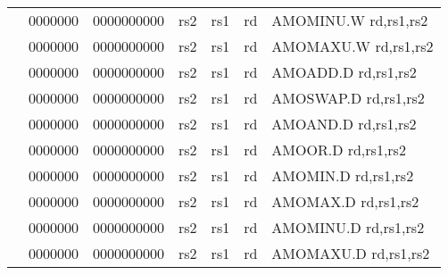 \begin{table}[p]
\begin{small}
\begin{center}
\begin{tabular}{rcccccccccl}
&
\multicolumn{1}{|c|}{0000000} &
\multicolumn{5}{c|}{0000000000} &
\multicolumn{1}{c|}{rs2} &
\multicolumn{1}{c|}{rs1} &
\multicolumn{1}{c|}{rd} & AMOMINU.W rd,rs1,rs2 \\
\cline{2-10}
  

&
\multicolumn{1}{|c|}{0000000} &
\multicolumn{5}{c|}{0000000000} &
\multicolumn{1}{c|}{rs2} &
\multicolumn{1}{c|}{rs1} &
\multicolumn{1}{c|}{rd} & AMOMAXU.W rd,rs1,rs2 \\
\cline{2-10}
  

&
\multicolumn{1}{|c|}{0000000} &
\multicolumn{5}{c|}{0000000000} &
\multicolumn{1}{c|}{rs2} &
\multicolumn{1}{c|}{rs1} &
\multicolumn{1}{c|}{rd} & AMOADD.D rd,rs1,rs2 \\
\cline{2-10}
  

&
\multicolumn{1}{|c|}{0000000} &
\multicolumn{5}{c|}{0000000000} &
\multicolumn{1}{c|}{rs2} &
\multicolumn{1}{c|}{rs1} &
\multicolumn{1}{c|}{rd} & AMOSWAP.D rd,rs1,rs2 \\
\cline{2-10}
  

&
\multicolumn{1}{|c|}{0000000} &
\multicolumn{5}{c|}{0000000000} &
\multicolumn{1}{c|}{rs2} &
\multicolumn{1}{c|}{rs1} &
\multicolumn{1}{c|}{rd} & AMOAND.D rd,rs1,rs2 \\
\cline{2-10}
  

&
\multicolumn{1}{|c|}{0000000} &
\multicolumn{5}{c|}{0000000000} &
\multicolumn{1}{c|}{rs2} &
\multicolumn{1}{c|}{rs1} &
\multicolumn{1}{c|}{rd} & AMOOR.D rd,rs1,rs2 \\
\cline{2-10}
  

&
\multicolumn{1}{|c|}{0000000} &
\multicolumn{5}{c|}{0000000000} &
\multicolumn{1}{c|}{rs2} &
\multicolumn{1}{c|}{rs1} &
\multicolumn{1}{c|}{rd} & AMOMIN.D rd,rs1,rs2 \\
\cline{2-10}
  

&
\multicolumn{1}{|c|}{0000000} &
\multicolumn{5}{c|}{0000000000} &
\multicolumn{1}{c|}{rs2} &
\multicolumn{1}{c|}{rs1} &
\multicolumn{1}{c|}{rd} & AMOMAX.D rd,rs1,rs2 \\
\cline{2-10}
  

&
\multicolumn{1}{|c|}{0000000} &
\multicolumn{5}{c|}{0000000000} &
\multicolumn{1}{c|}{rs2} &
\multicolumn{1}{c|}{rs1} &
\multicolumn{1}{c|}{rd} & AMOMINU.D rd,rs1,rs2 \\
\cline{2-10}
  

&
\multicolumn{1}{|c|}{0000000} &
\multicolumn{5}{c|}{0000000000} &
\multicolumn{1}{c|}{rs2} &
\multicolumn{1}{c|}{rs1} &
\multicolumn{1}{c|}{rd} & AMOMAXU.D rd,rs1,rs2 \\
\cline{2-10}
  


\end{tabular}
\end{center}
\end{small}
\end{table}
